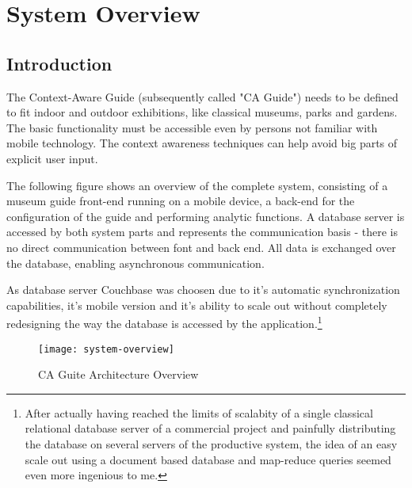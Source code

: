 
\chapter{System Overview} %

\label{systemoverview} %



\section{Introduction}

The Context-Aware Guide (subsequently called "CA Guide") needs to be defined to fit indoor and outdoor exhibitions, like classical museums, parks and gardens. 
The basic functionality must be accessible even by persons not familiar with mobile technology. The context awareness techniques can help avoid big parts of explicit user input.

The following figure shows an overview of the complete system, consisting of a museum guide front-end running on a mobile device, a back-end for the configuration of the guide and performing analytic functions. A database server is accessed by both system parts and represents the communication basis - there is no direct communication between font and back end. All data is exchanged over the database, enabling asynchronous communication.

As database server Couchbase was choosen due to it's automatic synchronization capabilities, it's mobile version and it's ability to scale out without completely redesigning the way the database is accessed by the application.\footnote{After actually having reached the limits of scalabity of a single classical relational database server of a commercial project and painfully distributing the database on several servers of the productive system, the idea of an easy scale out using a document based database and map-reduce queries seemed even more ingenious to me.} 

\begin{figure}[H]
\centering
\texttt{[image: system-overview]}
\caption{CA Guite Architecture Overview}
\end{figure}

